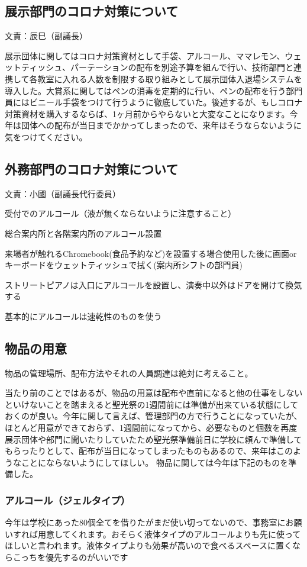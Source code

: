 \documentclass[dvipdfmx,jb5]{jreport}
\begin{document}
\subsection{展示部門のコロナ対策について} 文責：辰巳（副議長） \vspace{2mm}

展示団体に関してはコロナ対策資材として手袋、アルコール、ママレモン、ウェットティッシュ、パーテーションの配布を別途予算を組んで行い、技術部門と連携して各教室に入れる人数を制限する取り組みとして展示団体入退場システムを導入した。大賞系に関してはペンの消毒を定期的に行い、ペンの配布を行う部門員にはビニール手袋をつけて行うように徹底していた。後述するが、もしコロナ対策資材を購入するならば、1ヶ月前からやらないと大変なことになります。今年は団体への配布が当日までかかってしまったので、来年はそうならないように気をつけてください。

\subsection{外務部門のコロナ対策について} 文責：小國（副議長代行委員） \vspace{2mm}

受付でのアルコール（液が無くならないように注意すること）

総合案内所と各階案内所のアルコール設置

来場者が触れるChromebook(食品予約など)を設置する場合使用した後に画面orキーボードをウェットティッシュで拭く(案内所シフトの部門員)

ストリートピアノは入口にアルコールを設置し、演奏中以外はドアを開けて換気する

基本的にアルコールは速乾性のものを使う

\subsection{物品の用意}
物品の管理場所、配布方法やそれの人員調達は絶対に考えること。

当たり前のことではあるが、物品の用意は配布や直前になると他の仕事をしないといけないことを踏まえると聖光祭の1週間前には準備が出来ている状態にしておくのが良い。今年に関して言えば、管理部門の方で行うことになっていたが、ほとんど用意ができておらず、1週間前になってから、必要なものと個数を再度展示団体や部門に聞いたりしていたため聖光祭準備前日に学校に頼んで準備してもらったりとして、配布が当日になってしまったものもあるので、来年はこのようなことにならないようにしてほしい。
物品に関しては今年は下記のものを準備した。
\subsubsection{アルコール（ジェルタイプ）}今年は学校にあった80個全てを借りたがまだ使い切ってないので、事務室にお願いすれば用意してくれます。おそらく液体タイプのアルコールよりも先に使ってほしいと言われます。液体タイプよりも効果が高いので食べるスペースに置くならこっちを優先するのがいいです
\end{document}
